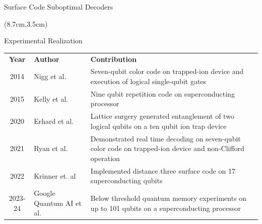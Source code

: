 \documentclass{dfki}
\begin{document}
\begin{frame}{Surface Code Suboptimal Decoders}
{\begin{textblock*}{6cm}
\begin{small}
\begin{itemize}
			\end{itemize}
		\end{small}
	\end{textblock*}
	\begin{textblock*}{10cm}(8.7cm,3.5cm)  %
	\end{textblock*}
	}
	\pause

\end{frame}

\begin{frame}{Experimental Realization}
	\vspace{-18pt}
	\begin{table}[h]
		\fontsize{10pt}{10pt}\selectfont
        \renewcommand{\arraystretch}{1.5} %
		\begin{tabular}{c|p{3cm}|p{8.5cm}}
			\textbf{Year} & \textbf{Author} & \textbf{Contribution} \\
			2014 & Nigg et al. & Seven-qubit color code on trapped-ion device and execution of logical single-qubit gates \cite{nigg_quantum_2014} \\
			2015 & Kelly et al. &  Nine qubit repetition code on superconducting processor \cite{kelly_state_2015} \\
			2020 & Erhard et al. & Lattice surgery generated entanglement of two logical qubits on a ten qubit ion trap device \cite{erhard_entangling_2020} \\
			2021 & Ryan et al. & Demonstrated real time decoding on seven-qubit color code on trapped-ion device and non-Clifford operation \cite{ryan-anderson_realization_2021}\\
			2022 & Krinner et. al & Implemented distance three surface code on 17 superconducting qubits \cite{krinner_realizing_2022}\\
			2023-24 & Google Quantum AI et al. & Below threshold quantum memory experiments on up to 101 qubits on a superconducting processor \cite{google_quantum_ai_suppressing_2023, google_quantum_ai_and_collaborators_quantum_2025}
		\end{tabular}
	\end{table}
\end{frame}
\end{document}
